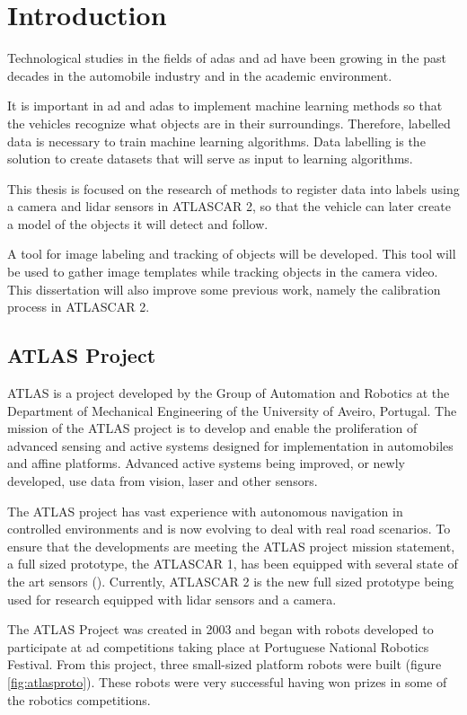 \chapter{Introduction}
Technological studies in the fields of \gls{adas} and \gls{ad} have been growing in the past decades in the automobile industry and in the academic environment. 

It is important in \gls{ad} and \gls{adas} to implement machine learning methods so that the vehicles recognize what objects are in their surroundings. Therefore, labelled data is necessary to train machine learning algorithms. Data labelling is the solution to create datasets that will serve as input to learning algorithms.

This thesis is focused on the research of methods to register data into labels using a camera and \gls{lidar} sensors in ATLASCAR 2, so that the vehicle can later create a model of the objects it will detect and follow.

A tool for image labeling and tracking of objects will be developed. This tool will be used to gather image templates while tracking objects in the camera video. This dissertation will also improve some previous work, namely the calibration process in ATLASCAR 2.

\section{ATLAS Project}

ATLAS is a project developed by the Group of Automation and Robotics at the Department of Mechanical Engineering of the University of Aveiro, Portugal. The mission of the ATLAS project is to develop and enable the proliferation of advanced sensing and active systems designed for implementation in automobiles and affine platforms. Advanced active systems being improved, or newly developed, use data from vision, laser and other sensors. 

The ATLAS project has vast experience with autonomous navigation in controlled environments and is now evolving to deal with real road scenarios. To ensure that the developments are meeting the ATLAS project mission statement, a full sized prototype, the ATLASCAR 1, has been equipped with several state of the art sensors (\cite{LARlabs}). Currently, ATLASCAR 2 is the new full sized prototype being used for research equipped with \gls{lidar} sensors and a camera.

The ATLAS Project was created in 2003 and began with robots developed to participate at \gls{ad} competitions taking place at Portuguese National Robotics Festival. From this project, three small-sized platform robots were built (figure \ref{fig:atlasproto}). These robots were very successful having won prizes in some of the robotics competitions. 


